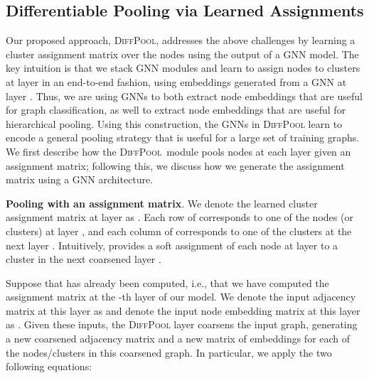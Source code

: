 \documentclass{article}
\newcommand{\jure}[1]{{{\textcolor{red}{[Jure: #1]}}}}
\newcommand{\will}[1]{{{\textcolor{purple}{[Will: #1]}}}}
\newcommand{\xhdr}[1]{{\noindent\bfseries #1}.}
\newcommand{\name}{\textsc{DiffPool}\xspace}
\newcommand{\cut}[1]{}
\begin{document}
\subsection{Differentiable Pooling via Learned Assignments}
\cut{
\jure{This is our main contribution. We need to discuss why our approach is sound and what is the intuition behind it.
It would be good to talk about possible strategies to learn this (factorization, etc.) but why our approach of learning to assign nodes to clusters is appropriate one.
We need a model that can for any network structure learn what is the right hierarchical pooling structure in order to aggregate information. 
I think such discussion is important as it let's reader to think and appreciate the problem. If we simply introduce the solution too quickly people won't appreciate it.}
\will{I tried to add more motivation in the paragraph above, and Rex and I are trying to add in more intuition behind the method in the paragraphs below.}
}

Our proposed approach, \name, addresses the above challenges by learning a cluster assignment matrix over the nodes using the output of a GNN model.
The key intuition is that we stack  GNN modules and learn to assign nodes to clusters at layer  in an end-to-end fashion, using embeddings generated from a GNN at layer .
Thus, we are using GNNs to both extract node embeddings that are useful for graph classification, as well to extract node embeddings that are useful for hierarchical pooling.
Using this construction, the GNNs in \name learn to encode a general pooling strategy that is useful for a large set of training graphs. 
We first describe how the \name\ module pools nodes at each layer given an assignment matrix; following this, we discuss how we generate the assignment matrix using a GNN architecture. 

\xhdr{Pooling with an assignment matrix}
We denote the learned cluster assignment matrix at layer  as . 
Each row of  corresponds to one of the  nodes (or clusters) at layer , and each column of  corresponds to one of the  clusters at the next layer . 
Intuitively,  provides a soft assignment of each node at layer  to a cluster in the next coarsened layer .

Suppose that  has already been computed, i.e., that we have computed the assignment matrix at the -th layer of our model.
We denote the input adjacency matrix at this layer as  and denote the input node embedding matrix at this layer as .
Given these inputs, the \name layer  coarsens the input graph, generating a new coarsened adjacency matrix  and a new matrix of embeddings  for each of the nodes/clusters in this coarsened graph.
In particular, we apply the two following equations:
\end{document}
